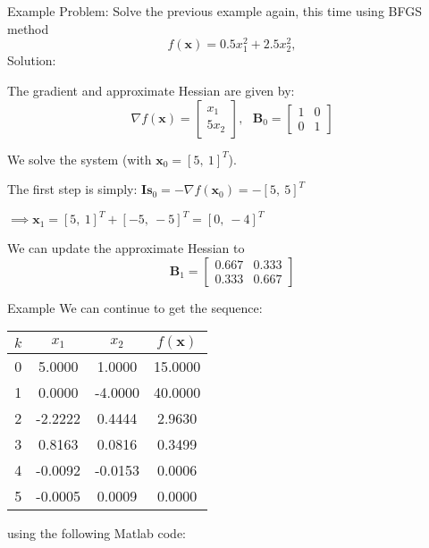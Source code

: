 \documentclass[xcolor=dvipsnames,11pt]{beamer}
\newcommand{\highlight}[1]{\textcolor{BrickRed}{#1}}
\begin{document}
\begin{frame}{Example}
	\highlight{Problem}: Solve the previous example again, this time using BFGS method
	$$f(\mathbf{x}) = 0.5 x_1^2 + 2.5 x_2^2,$$
	\highlight{Solution}:
	
	The gradient and approximate Hessian are given by:
	$$\nabla f(\mathbf{x}) = \begin{bmatrix} x_1 \\ 5x_2 \end{bmatrix}, ~~~\mathbf{B}_0 = \begin{bmatrix} 1 & 0 \\ 0 & 1 \end{bmatrix}$$
	
	We solve the system (with $\mathbf{x}_0 = [5,~1]^T$).
	
	The first step is simply: $\mathbf{I s}_0 = -\nabla f(\mathbf{x}_0) = -[5,~5]^T$ 
	
	$\implies \mathbf{x}_1 = [5,~1]^T + [-5,~-5]^T = [0,~-4]^T$
	
	We can update the approximate Hessian to 
	$$\mathbf{B}_1 = \begin{bmatrix} 0.667 & 0.333 \\ 0.333 & 0.667 \end{bmatrix}$$
	
	
\end{frame}


\begin{frame}{Example}
	We can continue to get the sequence:
	
	\begin{center}
		\begin{tabular}{|c|cc|c|}
			\hline
			$k$ & $x_1$ & $x_2$ & $f(\mathbf{x})$ \\
			\hline
			0 &    5.0000 &    1.0000 &   15.0000 \\ 
			1 &    0.0000 &   -4.0000 &   40.0000 \\ 
			2 &   -2.2222 &    0.4444 &    2.9630 \\ 
			3 &    0.8163 &    0.0816 &    0.3499 \\ 
			4 &   -0.0092 &   -0.0153 &    0.0006 \\ 
			5 &   -0.0005 &    0.0009 &    0.0000 \\ 
			\hline
		\end{tabular}
		
	\end{center}
	using the following Matlab code:
\end{frame}
\end{document}
